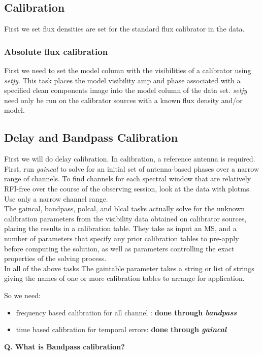 \documentclass[10pt]{report}
\newcommand{\tbf}[1]{\textbf{#1}}
\newcommand{\tit}[1]{\textit{#1}}
\begin{document}
\subsection{Calibration}
First we set flux densities are set for the standard flux calibrator in the data.
\subsubsection{Absolute flux calibration}
First we need to set the model column with the visibilities of a calibrator using \tit{setjy}. This task places the model visibility amp and phase associated with a specified clean components image into the model column of the data set. \tit{setjy} need only be run on the calibrator sources with a known flux density and/or model.
\subsection{Delay and Bandpass Calibration}
First we will do delay calibration. In calibration, a reference antenna is required. First, run \tit{gaincal} to solve for an initial set of antenna-based phases over a narrow range of channels. To find channels for each spectral window that are relatively RFI-free over the course of the observing session, look at the data with plotms. Use only a narrow channel range.\\

The gaincal, bandpass, polcal, and blcal tasks actually solve for the unknown calibration parameters from the visibility data obtained on calibrator sources, placing the results in a calibration table. They take as input an MS, and a number of parameters that specify any prior calibration tables to pre-apply before computing the solution, as well as parameters controlling the exact properties of the solving process.\\

In all of the above tasks The gaintable parameter takes a string or list of strings giving the names of one or more calibration tables to arrange for application.

So we need:
\begin{itemize}
\item frequency based calibration for all channel : \tbf{done through \tit{bandpass}}
\item time based calibration  for temporal errors: \tbf{done through \tit{gaincal}}
\end{itemize}
\tbf{Q. What is Bandpass calibration?}\\
\end{document}
